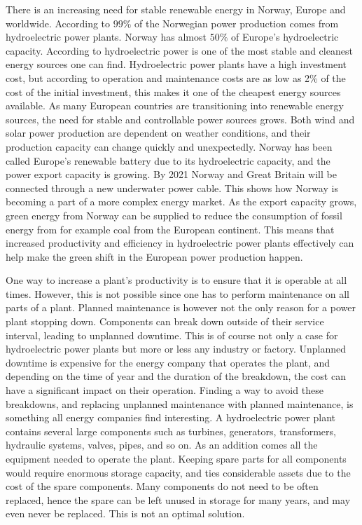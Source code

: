 There is an increasing need for stable renewable energy in Norway, Europe and worldwide. According to \cite{Statkraft2009} $99\%$ of the Norwegian power production comes from hydroelectric power plants. Norway has almost $50\%$ of Europe's hydroelectric capacity. According to \cite{Statkraft2009} hydroelectric power is one of the most stable and cleanest energy sources one can find. Hydroelectric power plants have a high investment cost, but according to \cite{Selak2014} operation and maintenance costs are as low as 2\% of the cost of the initial investment, this makes it one of the cheapest energy sources available. As many European countries are transitioning into renewable energy sources, the need for stable and controllable power sources grows. Both wind and solar power production are dependent on weather conditions, and their production capacity can change quickly and unexpectedly. Norway has been called Europe's renewable battery due to its hydroelectric capacity, and the power export capacity is growing. By 2021 Norway and Great Britain will be connected through a new underwater power cable. This shows how Norway is becoming a part of a more complex energy market. As the export capacity grows, green energy from Norway can be supplied to reduce the consumption of fossil energy from for example coal from the European continent. This means that increased productivity and efficiency in hydroelectric power plants effectively can help make the green shift in the European power production happen. 

One way to increase a plant's productivity is to ensure that it is operable at all times. However, this is not possible since one has to perform maintenance on all parts of a plant. Planned maintenance is however not the only reason for a power plant stopping down. Components can break down outside of their service interval, leading to unplanned downtime. This is of course not only a case for hydroelectric power plants but more or less any industry or factory. Unplanned downtime is expensive for the energy company that operates the plant, and depending on the time of year and the duration of the breakdown, the cost can have a significant impact on their operation. Finding a way to avoid these breakdowns, and replacing unplanned maintenance with planned maintenance, is something all energy companies find interesting. A hydroelectric power plant contains several large components such as turbines, generators, transformers, hydraulic systems, valves, pipes, and so on.  As an addition comes all the equipment needed to operate the plant. Keeping spare parts for all components would require enormous storage capacity, and ties considerable assets due to the cost of the spare components. Many components do not need to be often replaced, hence the spare can be left unused in storage for many years, and may even never be replaced. This is not an optimal solution. 

